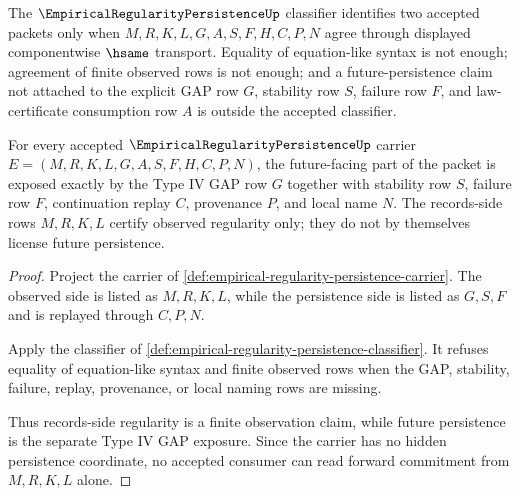\begin{definition}
\label{def:empirical-regularity-persistence-classifier}
The $\EmpiricalRegularityPersistenceUp$ classifier identifies two accepted packets only when $M,R,K,L,G,A,S,F,H,C,P,N$ agree through displayed componentwise $\hsame$ transport. Equality of equation-like syntax is not enough; agreement of finite observed rows is not enough; and a future-persistence claim not attached to the explicit GAP row $G$, stability row $S$, failure row $F$, and law-certificate consumption row $A$ is outside the accepted classifier.
\end{definition}

\begin{theorem}
\label{thm:empirical-regularity-persistence-gap-exposure}
For every accepted $\EmpiricalRegularityPersistenceUp$ carrier $E=(M,R,K,L,G,A,S,F,H,C,P,N)$, the future-facing part of the packet is exposed exactly by the Type IV GAP row $G$ together with stability row $S$, failure row $F$, continuation replay $C$, provenance $P$, and local name $N$. The records-side rows $M,R,K,L$ certify observed regularity only; they do not by themselves license future persistence.
\end{theorem}
\begin{proof}
Project the carrier of \autoref{def:empirical-regularity-persistence-carrier}. The observed side is listed as $M,R,K,L$, while the persistence side is listed as $G,S,F$ and is replayed through $C,P,N$.

Apply the classifier of \autoref{def:empirical-regularity-persistence-classifier}. It refuses equality of equation-like syntax and finite observed rows when the GAP, stability, failure, replay, provenance, or local naming rows are missing.

Thus records-side regularity is a finite observation claim, while future persistence is the separate Type IV GAP exposure. Since the carrier has no hidden persistence coordinate, no accepted consumer can read forward commitment from $M,R,K,L$ alone.
\end{proof}

